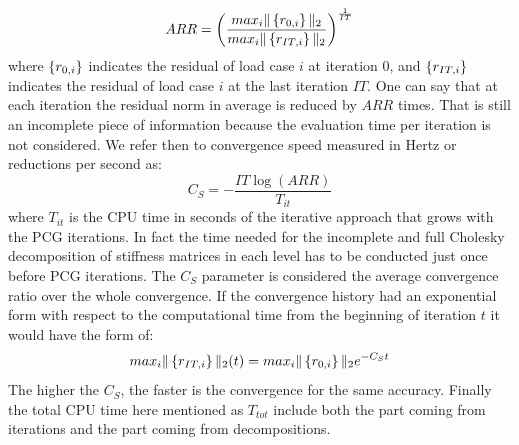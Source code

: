  \begin{equation}
 \label{eq.arr}
 ARR=\left(\frac{max_i\|\left\lbrace{r_{0,i}}\right \rbrace\|_2}{max_i\|\left\lbrace{r_{IT,i}}\right \rbrace\|_2}\right)^{\frac{1}{IT}}
 \end{equation}
 where $\left\lbrace{r_{0,i}}\right \rbrace$ indicates the residual of load case $i$ at iteration 0, and $\left\lbrace{r_{IT,i}}\right \rbrace$ indicates the residual of load case $i$ at the last iteration $IT$.
 One can say that at each iteration the residual norm in average is reduced by $ARR$ times. That is still an incomplete piece of information because the evaluation time per iteration is not considered.
  We refer then to convergence speed measured in Hertz or reductions per second  as:
 \begin{equation}
 \label{eq.cs}
 C_S=-\frac{IT \log\left(ARR\right)}{T_{it}}
 \end{equation}
 where $T_{it}$ is the CPU time in seconds of the iterative approach that grows with the PCG iterations. In fact the time needed for the incomplete and full Cholesky decomposition of stiffness matrices in each level has to be conducted just once before PCG iterations. The $C_S$ parameter is considered the average convergence ratio over the whole convergence. If the convergence history had an exponential form with respect to the computational time from the beginning of iteration $t$ it would have the form of:
 \begin{equation}
 max_i\|\left\lbrace{r_{IT,i}}\right \rbrace\|_2(t)=max_i\|\left\lbrace{r_{0,i}}\right \rbrace\|_2e^{-C_St}
 \end{equation}
 The higher the $C_S$, the faster is the convergence for the same accuracy. 
  Finally the total CPU time here mentioned as ${T_{tot}}$ include both the part coming from iterations and the part coming from decompositions.
